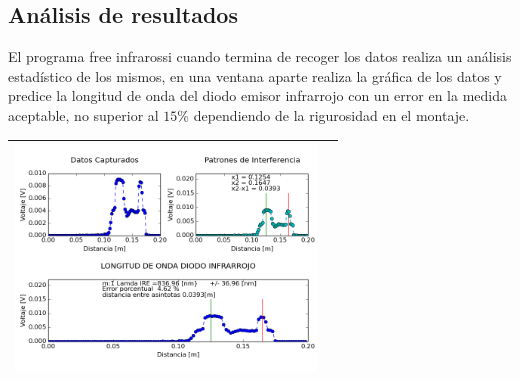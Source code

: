 \documentclass[12]{article}
\newenvironment{Figure}
{\par\medskip\noindent\minipage{\linewidth}}
{\endminipage\par\medskip}
\begin{document}
\begin{multicols}{2}
\section{Análisis de resultados}
El programa free infrarossi cuando termina de recoger los datos realiza un análisis estadístico de los mismos, en una ventana aparte realiza la gráfica de los datos y predice la longitud de onda del diodo emisor infrarrojo con un error en la medida aceptable, no superior al $15\%$ dependiendo de la rigurosidad en el montaje.
\begin{Figure}	
\center
\begin{tabular}{|l|r|}
\hline
\includegraphics[width=8cm, height=6cm]{img/Graficas.png} \\ \hline
\end{tabular}
\label{fig:g1}
\end{Figure}

\end{multicols}
\end{document}
